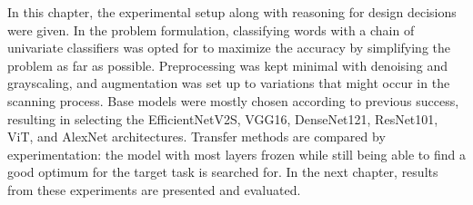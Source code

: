 \documentclass[english,twoside,openright]{UH_DS_MSc}
\begin{document}



In this chapter, the experimental setup along with reasoning for design decisions were given.
In the problem formulation, classifying words with a chain of univariate classifiers was opted for to 
maximize the accuracy by simplifying the problem as far as possible.
Preprocessing was kept minimal with denoising and grayscaling, 
and augmentation was set up to variations that might occur in the scanning process. Base models were mostly
chosen according to previous success, resulting in selecting the EfficientNetV2S, VGG16, DenseNet121, ResNet101, ViT, and AlexNet architectures.
Transfer methods are compared by experimentation: the model with most layers frozen while still being able to find a good optimum 
for the target task is searched for. In the next chapter, 
results from these experiments are presented and evaluated.
\end{document}
